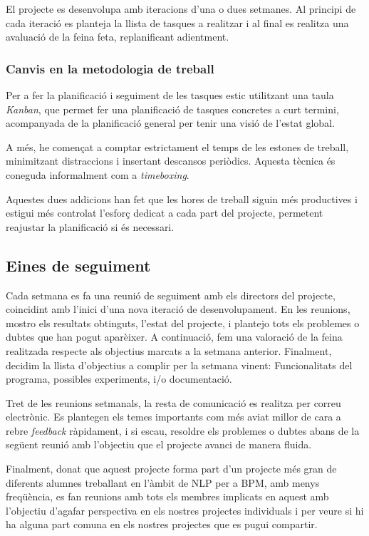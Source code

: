 \documentclass[10pt,a4paper]{article}
\begin{document}
El projecte es desenvolupa amb iteracions d'una o dues setmanes. Al principi de cada iteració es planteja la llista de tasques a realitzar i al final es realitza una avaluació de la feina feta, replanificant adientment. 

\subsubsection*{Canvis en la metodologia de treball}
\label{canvis}

Per a fer la planificació i seguiment de les tasques estic utilitzant una taula \emph{Kanban}, que permet fer una planificació de tasques concretes a curt termini, acompanyada de la planificació general per tenir una visió de l'estat global. 

A més, he començat a comptar estrictament el temps de les estones de treball, minimitzant distraccions i insertant descansos periòdics. Aquesta tècnica és coneguda informalment com a \emph{timeboxing}.

Aquestes dues addicions han fet que les hores de treball siguin més productives i estigui més controlat l'esforç dedicat a cada part del projecte, permetent reajustar la planificació si és necessari.

\subsection{Eines de seguiment}

Cada setmana es fa una reunió de seguiment amb els directors del projecte, coincidint amb l'inici d'una nova iteració de desenvolupament. En les reunions,  mostro els resultats obtinguts, l'estat del projecte, i plantejo tots els problemes o dubtes que han pogut aparèixer. A continuació, fem una valoració de la feina realitzada respecte als objectius marcats a la setmana anterior. Finalment, decidim la llista d'objectius a complir per la setmana vinent: Funcionalitats del programa, possibles experiments, i/o documentació.

Tret de les reunions setmanals, la resta de comunicació es realitza per correu electrònic. Es plantegen els temes importants com més aviat millor de cara a rebre \emph{feedback} ràpidament, i si escau, resoldre els problemes o dubtes abans de la següent reunió amb l'objectiu que el projecte avanci de manera fluida. 

Finalment, donat que aquest projecte forma part d'un projecte més gran de diferents alumnes treballant en l'àmbit de NLP per a BPM, amb menys freqüència, es fan reunions amb tots els membres implicats en aquest amb l'objectiu d'agafar perspectiva en els nostres projectes individuals i per veure si hi ha alguna part comuna en els nostres projectes que es pugui compartir.
\end{document}
